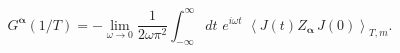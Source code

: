 \begin{equation}
G^{\mathbf{\alpha }}(1/T)
=-\lim_{\omega \rightarrow 0}\frac{1}{2\omega \pi ^{2}%
}\int\nolimits_{-\infty }^{\infty }dt\,\,e^{i\omega t}\,\,\left\langle
J(t)Z_{\mathbf{\alpha }}\,J(0)\right\rangle _{T,m}.  \label{2}
\end{equation}

